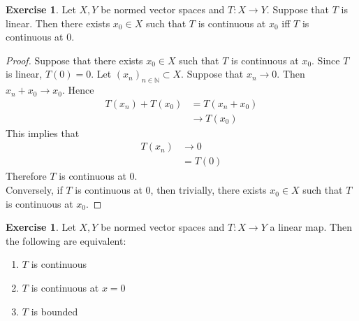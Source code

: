 \documentclass[12pt]{amsart}
\theoremstyle{definition}
\newtheorem{ex}[definition]{Exercise}
\newcommand{\N}{\mathbb{N}}
\newcommand{\lex}[1]{\label{ex:#1}}
\begin{document}
	\begin{ex} \lex{42003.1}
	Let $X, Y$ be normed vector spaces and $T:X \rightarrow Y$. Suppose that $T$ is linear. Then there exists $x_0 \in X$ such that $T$ is continuous at $x_0$ iff $T$ is continuous at 0.
	\end{ex}
	
	\begin{proof}
	Suppose that there exists $x_0 \in X$ such that $T$ is continuous at $x_0$. Since $T$ is linear, $T(0) = 0$. Let $(x_n)_{n \in \N} \subset X$. Suppose that $x_n \rightarrow 0$. Then $x_n + x_0 \rightarrow x_0$. Hence 
	\begin{align*}
	T(x_n) + T(x_0)
	&= T(x_n + x_0) \\
	& \rightarrow T(x_0)
	\end{align*}	  
	This implies that 
	\begin{align*}
	T(x_n) 
	&\rightarrow 0 \\
	& = T(0)
	\end{align*}	 
	Therefore $T$ is continuous at $0$. \\
	Conversely, if $T$ is continuous at $0$, then trivially, there exists $x_0 \in X$ such that $T$ is continuous at $x_0$.
	\end{proof}
	
	\begin{ex} \lex{42004}
		Let $X,Y$ be normed vector spaces and $T:X \rightarrow Y$ a linear map. Then the following are equivalent:
		\begin{enumerate}
			\item $T$ is continuous
			\item $T$ is continuous at $x=0$
			\item $T$ is bounded
		\end{enumerate}
	\end{ex}
	
\end{document}
